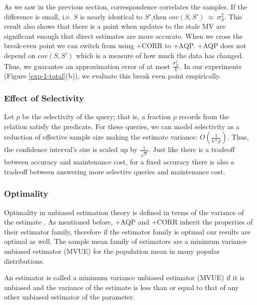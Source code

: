 As we saw in the previous section, correspondence correlates the samples.
If the difference is small, i.e. $S$ is nearly identical to $S'$,then $cov(S,S')~\approx~\sigma_{S}^2$. 
This result also shows that there is a point when updates to the stale MV are significant enough that direct estimates are more accurate.
When we cross the break-even point we can switch from using \svcnospace+CORR to \svcnospace+AQP.
\svcnospace+AQP does not depend on $cov(S,S')$ which is a measure of how much the data has changed.
Thus, we guarantee an approximation error of at most $\frac{\sigma_{S'}^2}{k}$.
In our experiments (Figure \ref{exp-1-total}(b)), we evaluate this break even point empirically. 

\subsubsection{Effect of Selectivity}
Let $p$ be the selectivity of the query; that is, a fraction $p$ records from the relation satisfy the predicate.
For these queries, we can model selectivity as a reduction of effective sample size making the
estimate variance: $O(\frac{1}{k*p})$.
Thus, the confidence interval's size is scaled up by $\frac{1}{\sqrt{p}}$.
Just like there is a tradeoff between accuracy and maintenance cost, for a fixed accuracy 
there is also a tradeoff between answering more selective queries and maintenance cost.

\subsubsection{Optimality}
Optimality in unbiased estimation theory is defined in terms of the variance of the estimate \cite{cox1979theoretical}.
As mentioned before, \svcnospace+AQP and \svcnospace+CORR inherit the properties of their estimator family, therefore if the estimator family is optimal
our results are optimal as well.
The sample mean family of estimators are a minimum variance unbiased estimator (MVUE) for the population mean in many popular distributions.
\begin{proposition}
An estimator is called a minimum variance unbiased estimator (MVUE) if it is unbiased and the variance of the estimate is less than or equal to that of any other unbiased estimator of the parameter.
\end{proposition}

